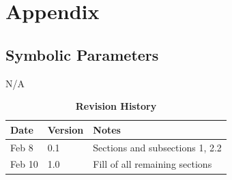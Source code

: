 \documentclass[12pt, titlepage]{article}
\begin{document}




\newpage

\section{Appendix}


\subsection{Symbolic Parameters}



N/A

\newpage

\begin{table}[hp]
\caption{\bf Revision History}
\begin{tabularx}{\textwidth}{p{3cm}p{2cm}X}
\toprule {\bf Date} & {\bf Version} & {\bf Notes}\\
\midrule
Feb 8 & 0.1 & Sections and subsections 1, 2.2\\
Feb 10 & 1.0 & Fill of all remaining sections\\
\bottomrule
\end{tabularx}
\end{table}
\end{document}
